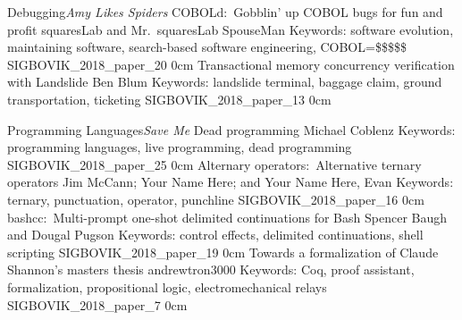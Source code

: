 \addtrack
	{Debugging}{\textit{Amy Likes Spiders}}
\addpaper
	{COBOLd:\ Gobblin' up COBOL bugs for fun and profit}
	{squaresLab and Mr.\ squaresLab SpouseMan}
	{Keywords: software evolution, maintaining software, search-based software engineering, COBOL=\$\$\$\$\$}
	{SIGBOVIK_2018_paper_20}
	{0cm}
	{}
\addpaper
	{Transactional memory concurrency verification with Landslide}
	{Ben Blum}
	{Keywords: landslide terminal, baggage claim, ground transportation, ticketing}
	{SIGBOVIK_2018_paper_13}
	{0cm}
	{}

\addtrack
	{Programming Languages}{\textit{Save Me}}
\addpaper
	{Dead programming}
	{Michael Coblenz}
	{Keywords: programming languages, live programming, dead programming}
	{SIGBOVIK_2018_paper_25}
	{0cm}
	{}
\addpaper
	{Alternary operators:\ Alternative ternary operators}
	{Jim McCann; Your Name Here; and Your Name Here, Evan}
	{Keywords: ternary, punctuation, operator, punchline}
	{SIGBOVIK_2018_paper_16}
	{0cm}
	{}
\addpaper
	{bashcc:\ Multi-prompt one-shot delimited continuations for Bash}
	{Spencer Baugh and Dougal Pugson}
	{Keywords: control effects, delimited continuations, shell scripting}
	{SIGBOVIK_2018_paper_19}
	{0cm}
	{}
\addpaper
	{Towards a formalization of Claude Shannon's masters thesis}
	{andrewtron3000}
	{Keywords: Coq, proof assistant, formalization, propositional logic, electromechanical relays}
	{SIGBOVIK_2018_paper_7}
	{0cm}
	{}

